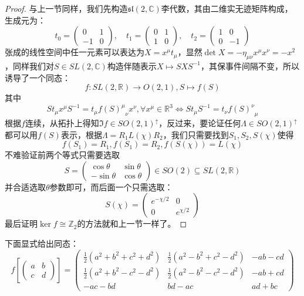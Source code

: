 \begin{proof}
	与上一节同样，我们先构造$\mathfrak{sl}(2,\mathbb{C})$李代数，其由二维实无迹矩阵构成，生成元为：
	\[t_0=\begin{pmatrix}
		0 &1 \\
		-1&0
	\end{pmatrix},\quad t_1=\begin{pmatrix}
	0 &1 \\
	1&0
	\end{pmatrix},\quad t_2=\begin{pmatrix}
	1 &0 \\
	0&-1
	\end{pmatrix} \]
	张成的线性空间中任一元素可以表达为$X=x^\mu t_\mu$，显然$\det X=-\eta_{\mu\nu}x^\mu x^\nu=-x^2$，同样我们对$S\in SL(2,\mathbb{C})$构造伴随表示$X\mapsto SXS^{-1}$，其保事件间隔不变，所以诱导了一个同态：
	\[f:SL(2,\mathbb{R})\to O(2,1),S\mapsto f(S)\]
	其中
	\[S t_\mu x^\mu S^{-1}=t_\mu {f(S)^\mu}_\nu x^\nu,\forall x^\mu \in\mathbb{R}^3\iff S t_\mu  S^{-1}=t_\nu {f(S)^\nu}_\mu \]
	根据$f$连续，从拓扑上得知$\Im f\in SO(2,1)^\uparrow$，反过来，要论证任何$\Lambda \in SO(2,1)^\uparrow$都可以用$f(S)$表示，根据$\Lambda=R_1 L(\chi) R_2$，我们只需要找到$S_1,S_2,S(\chi)$使得
	\[f(S_1)=R_1,f(S_1)=R_2,f(S(\chi))=L(\chi)\]
	不难验证前两个等式只需要选取
	\[S=\begin{pmatrix}
		\cos\theta &\sin\theta \\
		-\sin\theta&\cos\theta
	\end{pmatrix}\in SO(2)\subseteq SL(2,\mathbb{R})\]
	并合适选取$\theta$参数即可，而后面一个只需选取：
	\[S(\chi)=\begin{pmatrix}
		e^{-\chi/2} &0 \\
		0&e^{\chi/2} 
	\end{pmatrix}\]
	最后证明$\ker f\cong \mathbb{Z}_2$的方法就和上一节一样了。
\end{proof}
\begin{remark}
	下面显式给出同态：
	\begin{equation}
		f\left[\begin{pmatrix}
			a &b \\
			c&d
		\end{pmatrix}\right]=\begin{pmatrix}
		\frac{1}{2}\left(a^2+b^2+c^2+d^2\right) &\frac{1}{2}\left(a^2-b^2+c^2-d^2\right) &-ab-cd\\
		\frac{1}{2}\left(a^2+b^2-c^2-d^2\right)&\frac{1}{2}\left(a^2-b^2-c^2-d^2\right)&-ab+cd\\
		-ac-bd&bd-ac&ad+bc
		\end{pmatrix}
	\end{equation}
\end{remark}
